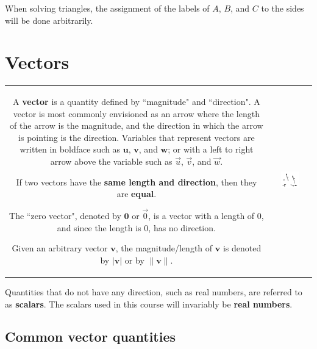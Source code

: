 \documentclass{article}
\begin{document}
When solving triangles, the assignment of the labels of \(A\), \(B\), and \(C\) to the sides will be done arbitrarily. 



\section*{Vectors}

\begin{tabular}{cc}
\parbox{0.5\textwidth}{
A {\bf vector} is a quantity defined by ``magnitude" and ``direction". A vector is most commonly envisioned as an arrow where the length of the arrow is the magnitude, and the direction in which the arrow is pointing is the direction. Variables that represent vectors are written in boldface such as \(\mathbf{u}\), \(\mathbf{v}\), and \(\mathbf{w}\); or with a left to right arrow above the variable such as \(\vec{u}\), \(\vec{v}\), and \(\vec{w}\). 

If two vectors have the {\bf same length and direction}, then they are {\bf equal}.

The ``zero vector", denoted by \(\mathbf{0}\) or \(\vec{0}\), is a vector with a length of \(0\), and since the length is \(0\), has no direction.  

Given an arbitrary vector \(\mathbf{v}\), the magnitude/length of \(\mathbf{v}\) is denoted by \(|\mathbf{v}|\) or by \(\|\mathbf{v}\|\).
} & \parbox{0.5\textwidth}{
\includegraphics[width = 0.5\textwidth]{basic_vectors}
}
\end{tabular}

Quantities that do not have any direction, such as real numbers, are referred to as {\bf scalars}. The scalars used in this course will invariably be {\bf real numbers}.



\subsection*{Common vector quantities}
\end{document}
